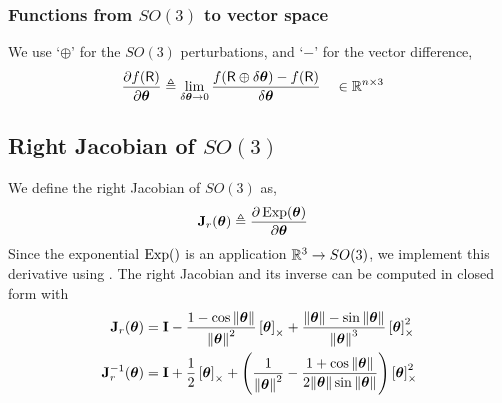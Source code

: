 \subsubsection{Functions from $SO(3)$ to vector space}

We use `$\oplus$' for the $SO(3)$ perturbations, and `$-$' for the vector difference,
%
\begin{align}
\dpar{f(\sR)}{\bth} &\te \lim_{\delta\bth\to0} \frac{f(\sR\oplus\delta\bth) - f(\sR)}{\delta\bth} && \in \bbR^{n\times 3} \label{equ:jacobian_SO3_Rn}
\end{align}
%


\subsection{Right Jacobian of $SO(3)$ }

We define the right Jacobian of $SO(3)$ as, 
%
\begin{align}
\bfJ_r(\bth) &\te \dpar{\Exp(\bth)}{\bth} 
\end{align}
%
Since the exponential $\Exp()$ is an application $\bbR^3\to SO(3)$,
we implement this derivative using .
%
%
The right Jacobian and its inverse can be computed in closed form with
%
\begin{align}
\bfJ_r(\bth) &= \bfI - \frac{1-\cos\nth}{\nth^2}\hatx{\bth} + \frac{\nth-\sin\nth}{\nth^3}\hatx{\bth}^2 \\
\bfJ_r\inv(\bth) &= \bfI + \frac12\hatx{\bth} + \left(\frac1{\nth^2} - \frac{1+\cos\nth}{2\nth\sin\nth}\right)\hatx{\bth}^2
\end{align}






